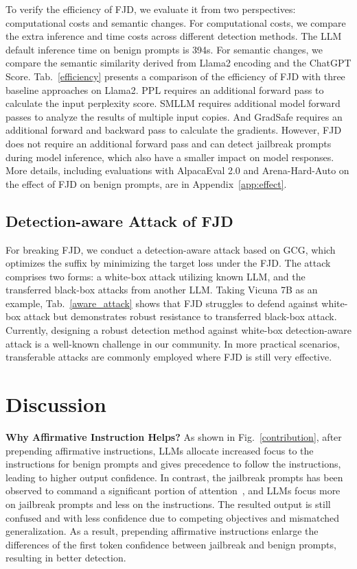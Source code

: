 \documentclass{article}
\begin{document}
To verify the efficiency of FJD, we evaluate it from two perspectives: computational costs and semantic changes. For computational costs, we compare the extra inference and time costs across different detection methods. The LLM default inference time on benign prompts is 394s. For semantic changes, we compare the semantic similarity derived from Llama2 encoding and the ChatGPT Score. Tab.~\ref{efficiency} presents a comparison of the efficiency of FJD with three baseline approaches on Llama2. PPL requires an additional forward pass to calculate the input perplexity score. SMLLM requires additional model forward passes to analyze the results of multiple input copies. And GradSafe requires an additional forward and backward pass to calculate the gradients. However, FJD does not require an additional forward pass and can detect jailbreak prompts during model inference, which also have a smaller impact on model responses. More details, including evaluations with AlpacaEval 2.0 and Arena-Hard-Auto on the effect of FJD on benign prompts, are in Appendix~\ref{app:effect}.



\subsection{Detection-aware Attack of FJD}

For breaking FJD, we conduct a detection-aware attack based on GCG, which optimizes the suffix by minimizing the target loss under the FJD. The attack comprises two forms: a white-box attack utilizing known LLM, and the transferred black-box attacks from another LLM. Taking Vicuna 7B as an example, Tab.~\ref{aware_attack} shows that FJD struggles to defend against white-box attack but demonstrates robust resistance to transferred black-box attack. Currently, designing a robust detection method against white-box detection-aware attack is a well-known challenge in our community. In more practical scenarios, transferable attacks are commonly employed where FJD is still very effective.


\section{Discussion}


\textbf{Why Affirmative Instruction Helps?} As shown in Fig.~\ref{contribution}, after prepending affirmative instructions, LLMs allocate increased focus to the instructions for benign prompts and gives precedence to follow the instructions, leading to higher output confidence. In contrast, the jailbreak prompts has been observed to command a significant portion of attention~\citep{arditi2024refusal}, and LLMs focus more on jailbreak prompts and less on the instructions. The resulted output is still confused and with less confidence due to competing objectives and mismatched generalization. As a result, prepending affirmative instructions enlarge the differences of the first token confidence between jailbreak and benign prompts, resulting in better detection. 
\end{document}
